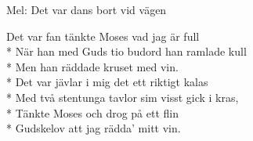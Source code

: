\begin{SongText}
    \begin{SongInfo}
        Mel: Det var dans bort vid vägen
    \end{SongInfo}
    \begin{SongVerse}
        Det var fan tänkte Moses vad jag är full\\*%
        När han med Guds tio budord han ramlade kull\\*%
        Men han räddade kruset med vin.\\*%
        Det var jävlar i mig det ett riktigt kalas\\*%
        Med två stentunga tavlor sim visst gick i kras,\\*%
        Tänkte Moses och drog på ett flin\\*%
        Gudskelov att jag rädda’ mitt vin.
    \end{SongVerse}
\end{SongText}
